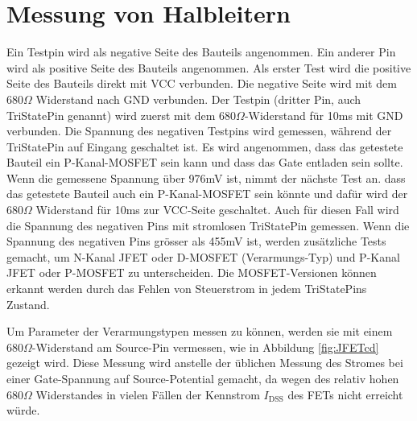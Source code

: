 \section{Messung von Halbleitern}
Ein Testpin wird als negative Seite des Bauteils angenommen.
Ein anderer Pin wird als positive Seite des Bauteils angenommen.
Als erster Test wird die positive Seite des Bauteils direkt mit VCC verbunden.
Die negative Seite wird mit dem \(680\Omega\) Widerstand nach GND verbunden.
Der Testpin (dritter Pin, auch TriStatePin genannt) wird zuerst mit dem \(680\Omega\)-Widerstand
für 10ms mit GND verbunden.
Die Spannung des negativen Testpins wird gemessen, während der TriStatePin auf Eingang
geschaltet ist.
Es wird angenommen, dass das getestete Bauteil ein P-Kanal-MOSFET sein kann und dass das Gate
entladen sein sollte.
Wenn die gemessene Spannung über 976mV ist, nimmt der nächste Test an. dass das getestete
Bauteil auch ein P-Kanal-MOSFET sein könnte und dafür wird der \(680\Omega\) Widerstand
für 10ms zur VCC-Seite geschaltet.
Auch für diesen Fall wird die Spannung des negativen Pins mit stromlosen TriStatePin gemessen.
Wenn die Spannung des negativen Pins grösser als 455mV ist, werden zusätzliche Tests gemacht, 
um N-Kanal JFET oder D-MOSFET (Verarmungs-Typ) und P-Kanal JFET oder P-MOSFET zu unterscheiden.
Die MOSFET-Versionen können erkannt werden durch das Fehlen von Steuerstrom in jedem 
TriStatePins Zustand.

Um Parameter der Verarmungstypen messen zu können, werden sie mit einem \(680 \Omega\)-Widerstand am
Source-Pin vermessen, wie in Abbildung \ref{fig:JFETcd} gezeigt wird. Diese Messung wird anstelle der
üblichen Messung des Stromes bei einer Gate-Spannung auf Source-Potential gemacht, da wegen des
relativ hohen \(680 \Omega\) Widerstandes in vielen Fällen der Kennstrom \(I_\mathrm{DSS}\) 
des FETs nicht erreicht würde.

